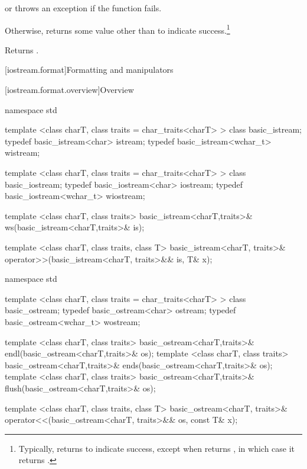 \begin{itemdescr}
\pnum
\returns
{}
or throws an exception
if the function fails.

Otherwise,
returns some value other than
to indicate success.\footnote{Typically,
returns  to indicate success, except when
returns
,
in which case it returns
.}

\pnum
{}
Returns
.
\end{itemdescr}

[iostream.format]{Formatting and manipulators}

[iostream.format.overview]{Overview}

%

\begin{codeblock}
namespace std {
  template <class charT, class traits = char_traits<charT> >
    class basic_istream;
  typedef basic_istream<char>     istream;
  typedef basic_istream<wchar_t> wistream;

  template <class charT, class traits = char_traits<charT> >
    class basic_iostream;
  typedef basic_iostream<char>    iostream;
  typedef basic_iostream<wchar_t> wiostream;

  template <class charT, class traits>
    basic_istream<charT,traits>& ws(basic_istream<charT,traits>& is);

  template <class charT, class traits, class T>
    basic_istream<charT, traits>&
    operator>>(basic_istream<charT, traits>&& is, T& x);
}
\end{codeblock}

%
%
%
%

%

\begin{codeblock}
namespace std {
  template <class charT, class traits = char_traits<charT> >
    class basic_ostream;
  typedef basic_ostream<char>     ostream;
  typedef basic_ostream<wchar_t> wostream;

  template <class charT, class traits>
    basic_ostream<charT,traits>& endl(basic_ostream<charT,traits>& os);
  template <class charT, class traits>
    basic_ostream<charT,traits>& ends(basic_ostream<charT,traits>& os);
  template <class charT, class traits>
    basic_ostream<charT,traits>& flush(basic_ostream<charT,traits>& os);

  template <class charT, class traits, class T>
    basic_ostream<charT, traits>&
    operator<<(basic_ostream<charT, traits>&& os, const T& x);
}
\end{codeblock}

